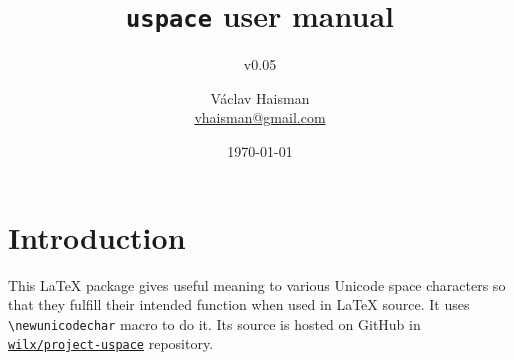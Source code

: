 \documentclass[paper=B5,DIV=calc,parskip=half]{scrartcl}
\author{Václav Haisman\texorpdfstring{%
    \\{\small\href{mailto:vhaisman+uspace@gmail.com?subject=[uspace]}{vhaisman@gmail.com}}}{}}
\date{\today}
\title{\texttt{uspace} user manual}
\subtitle{v0.05}
\begin{document}
\begin{titlepage}
  \maketitle
\end{titlepage}

\tableofcontents

\section{Introduction}%
%
This \LaTeX{} package gives useful meaning to various Unicode space
characters so that they fulfill their intended function when used in \LaTeX{}
source. It uses \lstinline|\newunicodechar| macro to do it. Its source is
hosted on GitHub in
\texttt{\href{https://github.com/wilx/project-uspace}{wilx/project-uspace}}
repository.
\end{document}
